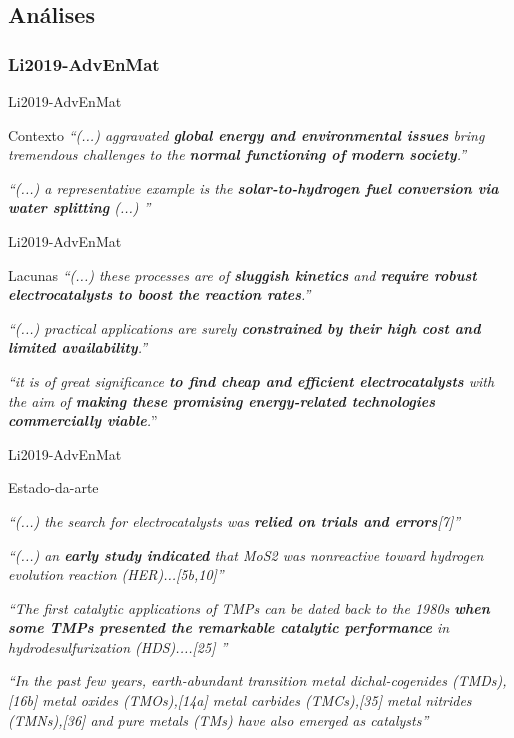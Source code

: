 \subsection{Análises}

\subsubsection*{Li2019-AdvEnMat}

\begin{frame}{Li2019-AdvEnMat} 
\begin{block}{Contexto}
\emph{``(...) aggravated \textbf{global energy and environmental issues} bring tremendous challenges to  the \textbf{normal functioning of modern society}.''}

\emph{``(...) a representative example is the \textbf{solar-to-hydrogen fuel conversion via water splitting} (...) ''}
\end{block}
\end{frame}

\begin{frame}{Li2019-AdvEnMat} 
\begin{block}{Lacunas}
\emph{``(...) these processes are of \textbf{sluggish kinetics} and \textbf{require robust electrocatalysts to boost the reaction rates}.''}

\emph{``(...) practical applications are surely \textbf{constrained by their high cost and limited availability}.''}

\emph{``it is of great significance \textbf{to find cheap and efficient electrocatalysts} with the aim of \textbf{making these promising energy-related technologies commercially viable}.}''
\end{block}
\end{frame}

\begin{frame}{Li2019-AdvEnMat} 
\begin{block}{Estado-da-arte}
\scriptsize{
\emph{``(...) the search for electrocatalysts was \textbf{relied on trials and errors}[7]''}

\emph{``(...) an \textbf{early study indicated} that MoS2 was nonreactive toward hydrogen evolution reaction (HER)...[5b,10]''}

\emph{``The first catalytic applications of TMPs can be dated back to the 1980s \textbf{when some TMPs presented the remarkable catalytic performance} in hydrodesulfurization (HDS)....[25] ''}

\emph{``In the past few years, earth-abundant transition metal dichal-cogenides (TMDs),[16b] metal oxides (TMOs),[14a] metal carbides (TMCs),[35] metal nitrides (TMNs),[36] and pure metals (TMs) have also emerged as catalysts''}
} %
\end{block}
\end{frame}


